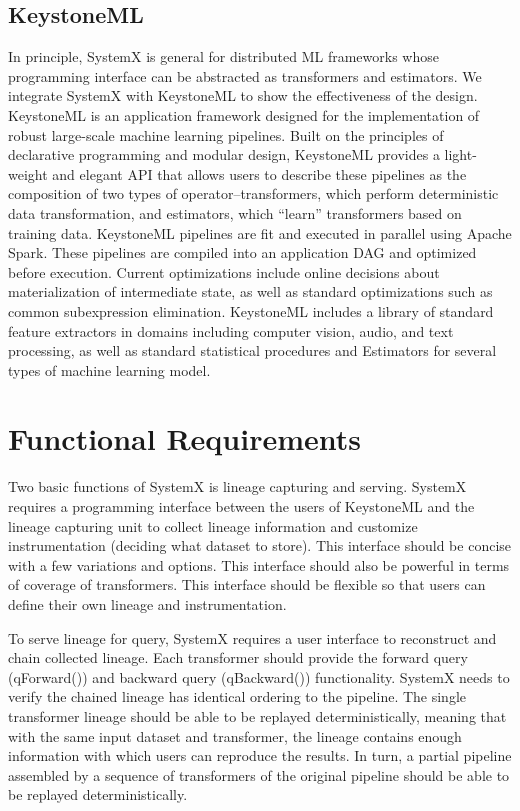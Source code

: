 \documentclass{sig-alternate}
\begin{document}
\subsection{KeystoneML}
In principle, SystemX is general for distributed ML frameworks whose programming interface can be abstracted as transformers and estimators.
We integrate SystemX with KeystoneML to show the effectiveness of the design.
KeystoneML is an application framework designed for the implementation of robust large-scale machine learning pipelines. Built on the principles of declarative programming and modular design, KeystoneML provides a light-weight and elegant API that allows users to describe these pipelines as the composition of two types of operator--transformers, which perform deterministic data transformation, and estimators, which ``learn'' transformers based on training data. KeystoneML pipelines are fit and executed in parallel using Apache Spark. These pipelines are compiled into an application DAG and optimized before execution. Current optimizations include online decisions about materialization of intermediate state, as well as standard optimizations such as common subexpression elimination. KeystoneML includes a library of standard feature extractors in domains including computer vision, audio, and text processing, as well as standard statistical procedures and Estimators for several types of machine learning model.

\section{Functional Requirements}
\label{sec:functional}
Two basic functions of SystemX is lineage capturing and serving.
SystemX requires a programming interface between the users of KeystoneML and the lineage capturing unit to 
collect lineage information and customize instrumentation (deciding what dataset to store). 
This interface should be concise with a few variations and options.
This interface should also be powerful in terms of coverage of transformers.
This interface should be flexible so that users can define their own lineage and instrumentation.

To serve lineage for query, SystemX requires a user interface to reconstruct and chain collected lineage.
Each transformer should provide the forward query (qForward()) and backward query (qBackward()) functionality.
SystemX needs to verify the chained lineage has identical ordering to the pipeline.
The single transformer lineage should be able to be replayed deterministically, meaning that with the same input dataset and transformer,
the lineage contains enough information with which users can reproduce the results.
In turn, a partial pipeline assembled by a sequence of transformers of the original pipeline should be able to be replayed deterministically.
\end{document}
